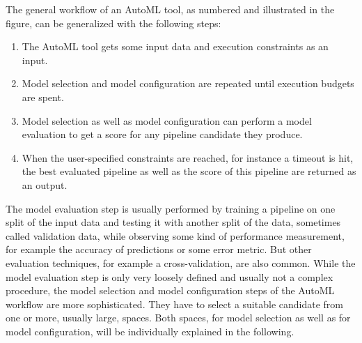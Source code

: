 The general workflow of an AutoML tool, as numbered and illustrated in the figure, can be generalized with the following steps:
\begin{enumerate}
    \item The AutoML tool gets some input data and execution constraints as an input.
    \item Model selection and model configuration are repeated until execution budgets are spent.
    \item Model selection as well as model configuration can perform a model evaluation to get a score for any pipeline candidate they produce.
    \item When the user-specified constraints are reached, for instance a timeout is hit, the best evaluated pipeline as well as the score of this pipeline are returned as an output.
\end{enumerate}
The model evaluation step is usually performed by training a pipeline on one split of the input data and testing it with another split of the data, sometimes called validation data, while observing some kind of performance measurement, for example the accuracy of predictions or some error metric.
But other evaluation techniques, for example a cross-validation, are also common.\newline
While the model evaluation step is only very loosely defined and usually not a complex procedure, the model selection and model configuration steps of the AutoML workflow are more sophisticated.
They have to select a suitable candidate from one or more, usually large, spaces. 
Both spaces, for model selection as well as for model configuration, will be individually explained in the following.

